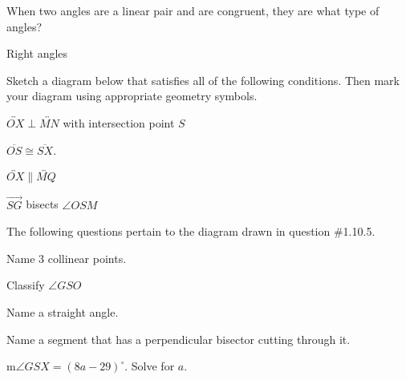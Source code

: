 \begin{exercises}
\begin{ex}
\e When two angles are a linear pair and are congruent, they are what type of angles?
\begin{sol}
Right angles
\end{sol}
\end{ex}

\newpage

\begin{ex} \e Sketch a diagram below that satisfies all of the following conditions.  Then mark your diagram using appropriate geometry symbols.
	\begin{exparts}
		\item $\overleftrightarrow{OX} \perp \overleftrightarrow{MN}$ with intersection point $S$
		\item $\overline{OS} \cong \overline{SX}$.
		\item $\overleftrightarrow{OX} \parallel \overleftrightarrow{MQ}$
		\item $\overrightarrow{SG}$ bisects $\angle OSM$
		
	\end{exparts}
	\vspace{0.5cm}
	\begin{sol}

\end{sol}
\end{ex}
	
\begin{ex} \e The following questions pertain to the diagram drawn in question \#1.10.5.
	\begin{exparts}
		\item Name 3 collinear points.
		\item Classify $\angle GSO$ 
		\item Name a straight angle.
		\item Name a segment that has a perpendicular bisector cutting through it.
		\item m$\angle GSX = (8a - 29)^\circ$.  Solve for $a$.\\
		

\end{exparts}
\end{ex}
\end{exercises}
